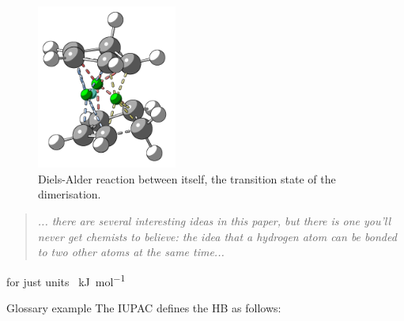 
\lipsum[1]

\begin{figure}
  \centering
  \includegraphics[width=0.41\textwidth]{../results/qtaim/img/dielsAlder.png}
  \caption{Diels-Alder reaction between itself, the transition state of the dimerisation.}
  \label{diels_alder}
\end{figure}

\color{blue}
  \begin{quote}
    \textit{... there are several interesting ideas in this paper, but there is one
    you'll never get chemists to believe: the idea that a hydrogen atom can be
    bonded to two other atoms at the same time...}
    \begin{flushright}
      \citet{hildebrand1958wendell}
    \end{flushright}
  \end{quote}
\color{black}

for just units
\SI{}{\kilo \joule \per \mole}

Glossary example
The \gls{IUPAC} defines the HB as follows:

\newpage

